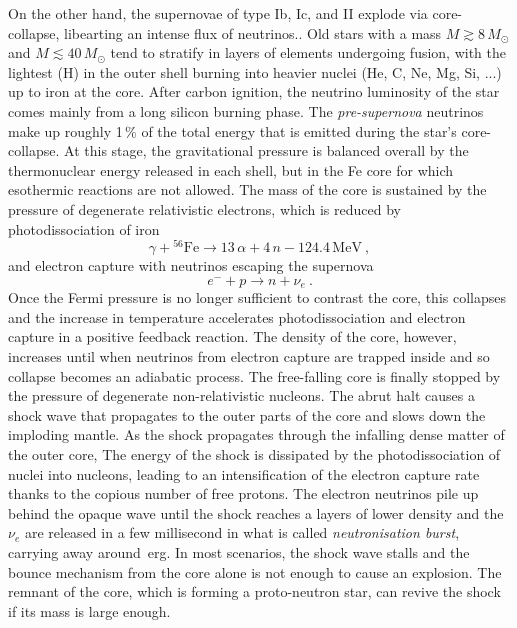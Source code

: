On the other hand, the supernovae of type Ib, Ic, and II explode via core-collapse, %
libearting an intense flux of neutrinos..
Old stars with a mass $M \gtrsim 8\,M_\odot$ and $M \lesssim 40\,M_\odot$ tend to stratify %
in layers of elements undergoing fusion, with the lightest (H) in the outer shell burning into heavier nuclei %
(He, C, Ne, Mg, Si, ...) up to iron at the core.
After carbon ignition, the neutrino luminosity of the star comes mainly from a long silicon burning phase.
The \emph{pre-supernova} neutrinos make up roughly 1\,\% of the total energy that is emitted during the star's core-collapse.
At this stage, the gravitational pressure is balanced overall by the thermonuclear energy released in each shell, %
but in the Fe core for which esothermic reactions are not allowed.
The mass of the core is sustained by the pressure of degenerate relativistic electrons, %
which is reduced by photodissociation of iron 
\begin{equation}
	\gamma +  {}^{56}\text{Fe} \to 13\,\alpha + 4\,n - 124.4\,\text{MeV}\ ,
\end{equation}
and electron capture with neutrinos escaping the supernova
\begin{equation}
	e^- + p \to n + \nu_e\ .
\end{equation}
Once the Fermi pressure is no longer sufficient to contrast the core, this collapses %
and the increase in temperature accelerates photodissociation and electron capture in a positive feedback reaction.
The density of the core, however, increases until when neutrinos from electron capture are trapped inside %
and so collapse becomes an adiabatic process.
The free-falling core is finally stopped by the pressure of degenerate non-relativistic nucleons.
The abrut halt causes a shock wave that propagates to the outer parts of the core and slows down the imploding mantle.
As the shock propagates through the infalling dense matter of the outer core,
The energy of the shock is dissipated by the photodissociation of nuclei into nucleons, %
leading to an intensification of the electron capture rate thanks to the copious number of free protons.
The electron neutrinos pile up behind the opaque wave until the shock reaches a layers of lower density 
and the $\nu_e$ are released in a few millisecond in what is called \emph{neutronisation burst}, %
carrying away around \,erg.
In most scenarios, the shock wave stalls and the bounce mechanism from the core alone is not enough to cause an explosion.
The remnant of the core, which is forming a proto-neutron star, can revive the shock if its mass is large enough.
